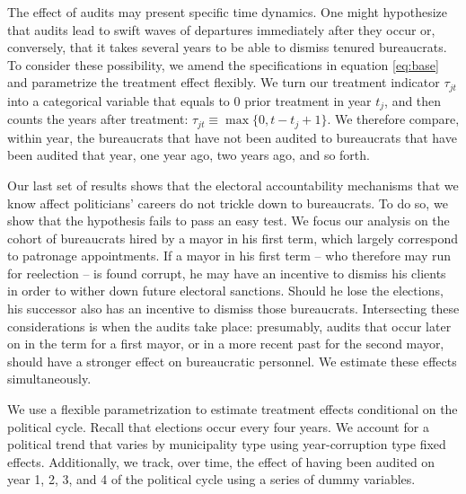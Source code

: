 \documentclass[12pt,a4paper]{article}
\theoremstyle{definition}
\begin{document}
The effect of audits may present specific time dynamics. One might hypothesize that audits lead to swift waves of departures immediately after they occur or, conversely, that it takes several years to be able to dismiss tenured bureaucrats. To consider these possibility, we amend the specifications in equation \ref{eq:base} and parametrize the treatment effect flexibly. We turn our treatment indicator $\tau_{jt}$ into a categorical variable that equals to 0 prior treatment in year $t_j$, and then counts the years after treatment: $\tau_{jt} \equiv \max\{0, t - t_j + 1\}$. We therefore compare, within year, the bureaucrats that have not been audited to bureaucrats that have been audited that year, one year ago, two years ago, and so forth. 

Our last set of results shows that the electoral accountability mechanisms that we know affect politicians' careers do not trickle down to bureaucrats. To do so, we show that the hypothesis fails to pass an easy test. We focus our analysis on the cohort of bureaucrats hired by a mayor in his first term, which largely correspond to patronage appointments. If a mayor in his first term -- who therefore may run for reelection -- is found corrupt, he may have an incentive to dismiss his clients in order to wither down future electoral sanctions. Should he lose the elections, his successor also has an incentive to dismiss those bureaucrats. Intersecting these considerations is when the audits take place: presumably, audits that occur later on in the term for a first mayor, or in a more recent past for the second mayor, should have a stronger effect on bureaucratic personnel. We estimate these effects simultaneously.

We use a flexible parametrization to estimate treatment effects conditional on the political cycle. Recall that elections occur every four years. We account for a political trend that varies by municipality type using year-corruption type fixed effects. Additionally, we track, over time, the effect of having been audited on year 1, 2, 3, and 4 of the political cycle using a series of dummy variables. 
\end{document}

